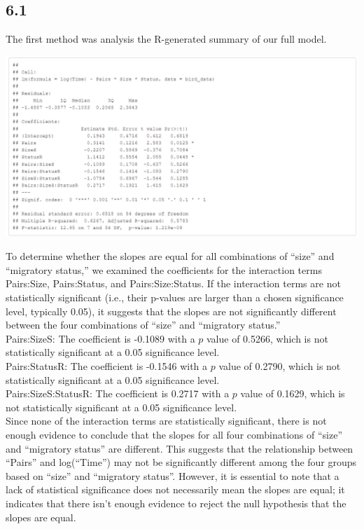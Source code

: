 \documentclass{article}
\begin{document}
\subsection*{6.1}
The first method was analysis the R-generated summary of our full model.
\begin{center}
\includegraphics[scale=0.5]{tables/log-time.png}
\end{center}


To determine whether the slopes are equal for all combinations of “size” and “migratory status,” we examined the coefficients for the interaction terms Pairs:Size, Pairs:Status, and Pairs:Size:Status. If the interaction terms are not statistically significant (i.e., their p-values are larger than a chosen significance level, typically 0.05), it suggests that the slopes are not significantly different between the four combinations of “size” and “migratory status.” \\

Pairs:SizeS: The coefficient is -0.1089 with a $p$ value of 0.5266, which is not statistically significant at a 0.05 significance level. \\

Pairs:StatusR: The coefficient is -0.1546 with a $p$ value of 0.2790, which is not statistically significant at a 0.05 significance level. \\

Pairs:SizeS:StatusR: The coefficient is 0.2717 with a $p$ value of 0.1629, which is not statistically significant at a 0.05 significance level. \\

Since none of the interaction terms are statistically significant, there is not enough evidence to conclude that the slopes for all four combinations of “size” and “migratory status” are different. This suggests that the relationship between “Pairs” and log(“Time”) may not be significantly different among the four groups based on “size” and “migratory status”. However, it is essential to note that a lack of statistical significance does not necessarily mean the slopes are equal; it indicates that there isn’t enough evidence to reject the null hypothesis that the slopes are equal.
\end{document}
